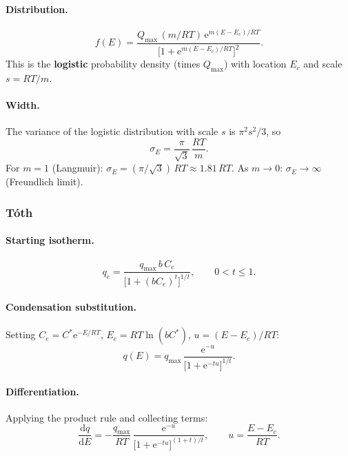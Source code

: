 \documentclass[journal=jacsat,manuscript=article]{achemso}
\begin{document}
\paragraph{Distribution.}
\begin{equation}
	f(E) = \frac{Q_{\max}\,(m/RT)\,\mathrm{e}^{m(E-E_c)/RT}}
	           {\bigl[1+\mathrm{e}^{m(E-E_c)/RT}\bigr]^{2}}.
	\label{eq:si_fE_sips}
\end{equation}
This is the \textbf{logistic} probability density (times $Q_{\max}$)
with location $E_c$ and scale $s = RT/m$.

\paragraph{Width.}
The variance of the logistic distribution with scale $s$ is $\pi^2 s^2/3$, so
\begin{equation}
	\sigma_E = \frac{\pi}{\sqrt{3}}\,\frac{RT}{m}.
	\label{eq:si_sigmaE_sips}
\end{equation}
For $m=1$ (Langmuir): $\sigma_E = (\pi/\sqrt{3})\,RT \approx 1.81\,RT$.
As $m \to 0$: $\sigma_E \to \infty$ (Freundlich limit).

\subsubsection{T\'{o}th}

\paragraph{Starting isotherm.}
\begin{equation}
	q_e = \frac{q_{\max}\, b\, C_e}{\bigl[1+(b C_e)^{t}\bigr]^{1/t}},
	\qquad 0 < t \leq 1.
\end{equation}

\paragraph{Condensation substitution.}
Setting $C_e = C^{\ast}\mathrm{e}^{-E/RT}$, $E_c = RT\ln(bC^{\ast})$,
$u = (E-E_c)/RT$:
\begin{equation}
	q(E) = q_{\max}\,\frac{\mathrm{e}^{-u}}{\bigl[1+\mathrm{e}^{-tu}\bigr]^{1/t}}.
\end{equation}

\paragraph{Differentiation.}
Applying the product rule and collecting terms:
\begin{equation}
	\frac{\mathrm{d}q}{\mathrm{d}E}
	= -\frac{q_{\max}}{RT}\,\frac{\mathrm{e}^{-u}}
	                               {\bigl[1+\mathrm{e}^{-tu}\bigr]^{(1+t)/t}},
	\qquad u = \frac{E-E_c}{RT}.
\end{equation}
\end{document}
